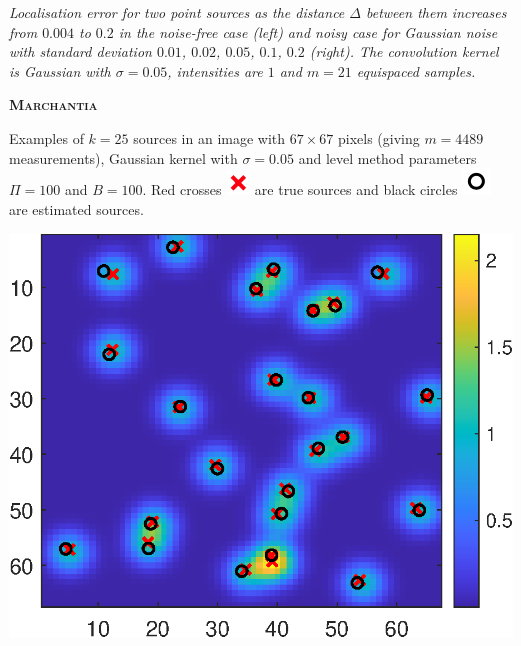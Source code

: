 \documentclass[a0paper,portrait,fontscale=0.35]{baposter}
\newcommand{\mycaption}[1]{
  {
    \smaller
    \emph{#1}
  }
}
\theoremstyle{plain}
\theoremstyle{plain}
\theoremstyle{definition}
\theoremstyle{plain}
\theoremstyle{definition}
\begin{document}
\begin{poster}
{\begin{minipage}[t]{0.51\textwidth}
\begin{minipage}[h]{0.97\textwidth}
      \vspace{-1em}
      \begin{center}
        \mycaption{Localisation error for two point sources
          as the distance $\Delta$ between them increases 
          from $0.004$ to $0.2$ in the noise-free case (left)
          and noisy case for Gaussian noise with standard deviation
          $0.01$, $0.02$, $0.05$, $0.1$, $0.2$ (right).
          The convolution kernel
          is Gaussian with $\sigma=0.05$, intensities are $1$ 
          and $m=21$ equispaced samples.
        }
        \end{center}
    \end{minipage}
  \end{minipage}
  \begin{minipage}[t]{0.48\textwidth}
    \begin{center}
      \larger
      \textbf{\textsc{Marchantia}}
    \end{center}
    
    \begin{minipage}[h]{\textwidth}
      Examples of $k=25$ sources in an image with $67 \times 67$ 
      pixels (giving $m=4489$ measurements), Gaussian kernel
      with $\sigma = 0.05$ and level method parameters
      $\Pi = 100$ and $B = 100$.
      Red crosses 
        \includegraphics[height=0.007\textheight]{img/cross.png}
       are true sources and 
      black circles 
        \includegraphics[height=0.007\textheight]{img/circle.png}
       are estimated sources.
      
     \vspace{0.7em}
      \begin{minipage}[t]{0.49\textwidth}
        \centering
        \includegraphics[height=0.1\textheight]{img/2d_noise_free_nolegend.eps}


\end{minipage}
\end{minipage}
\end{minipage}}
\end{poster}
\end{document}
